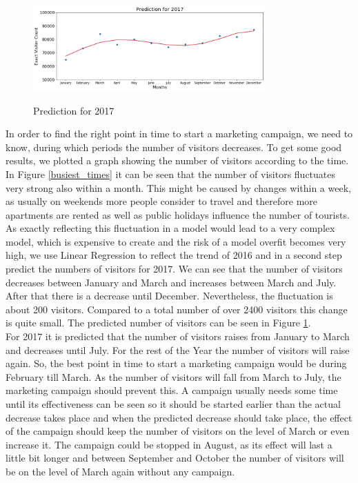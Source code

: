 \documentclass[journal]{IEEEtran}
\begin{document}
\begin{figure}
  \begin{center}
  \includegraphics[width=3.5in]{photo/6_prediction_2017.png}\\
  \caption{Prediction for 2017}\label{prediction_2017}
  \end{center}
\end{figure}

\noindent In order to find the right point in time to start a marketing campaign, we need to know, during which periods the number of visitors decreases. To get some good results, we plotted a graph showing the number of visitors according to the time.\\ In Figure \ref{busiest_times} it can be seen that the number of visitors fluctuates very strong also within a month. This might be caused by changes within a week, as usually on weekends more people consider to travel and therefore more apartments are rented as well as public holidays influence the number of tourists. As exactly reflecting this fluctuation in a model would lead to a very complex model, which is expensive to create and the risk of a model overfit becomes very high, we use Linear Regression to reflect the trend of 2016 and in a second step predict the numbers of visitors for 2017. We can see that the number of visitors decreases between January and March and increases between March and July. After that there is a decrease until December. Nevertheless, the fluctuation is about 200 visitors. Compared to a total number of over 2400 visitors this change is quite small.
The predicted number of visitors can be seen in Figure \ref{prediction_2017}.\\ For 2017 it is predicted that the number of visitors raises from January to March and decreases until July. For the rest of the Year the number of visitors will raise again. So, the best point in time to start a marketing campaign would be during February till March. As the number of visitors will fall from March to July, the marketing campaign should prevent this. A campaign usually needs some time until its effectiveness can be seen so it should be started earlier than the actual decrease takes place and when the predicted decrease should take place, the effect of the campaign should keep the number of visitors on the level of March or even increase it. The campaign could be stopped in August, as its effect will last a little bit longer and between September and October the number of visitors will be on the level of March again without any campaign.
\end{document}
